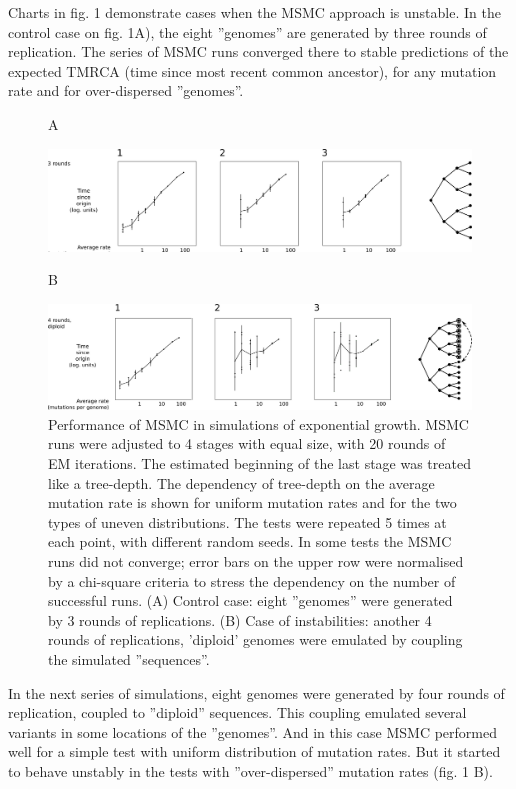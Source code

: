 \documentclass[12pt,aps]{revtex4}
\begin{document}
Charts in fig. 1 demonstrate cases when the MSMC approach is unstable. In the control case on fig. 1A), the eight ”genomes” are generated by three rounds of replication. The series of MSMC runs converged there to stable predictions of the expected TMRCA (time since most recent common ancestor), for any mutation rate and for over-dispersed ”genomes”.


\begin{figure}[h]
\flushleft \large \textsf{A}\\
\vskip 4pt
\centerline{\includegraphics[width=\columnwidth]{fig_msmc.png}}%
\flushleft \large \textsf{B}\\
\vskip 4pt
\centerline{\includegraphics[width=\columnwidth]{fig_msmc_diploid.png}}%
\caption{Performance of MSMC in simulations of exponential growth. MSMC runs were adjusted to 4 stages with equal size, with 20 rounds of EM iterations. The estimated beginning of the last stage was treated like a tree-depth. The dependency of tree-depth on the average mutation rate is shown for uniform mutation rates and for the two types of uneven distributions. The tests were repeated 5 times at each point, with different random seeds. In some tests the MSMC runs did not converge; error bars on the upper row were normalised by a chi-square criteria to stress the dependency on the number of successful runs. (A) Control case: eight ”genomes” were generated by 3 rounds of replications. (B) Case of instabilities: another 4 rounds of replications, ’diploid’ genomes were emulated by coupling the simulated ”sequences”.}
\label{fig_msmc}
\end{figure}

In the next series of simulations, eight genomes were generated by four rounds of replication, coupled to ”diploid” sequences. This coupling emulated several variants in some locations of the ”genomes”. And in this case MSMC performed well for a simple test with uniform distribution of mutation rates. But it started to behave unstably in the tests with ”over-dispersed” mutation rates (fig. 1 B).
\end{document}
